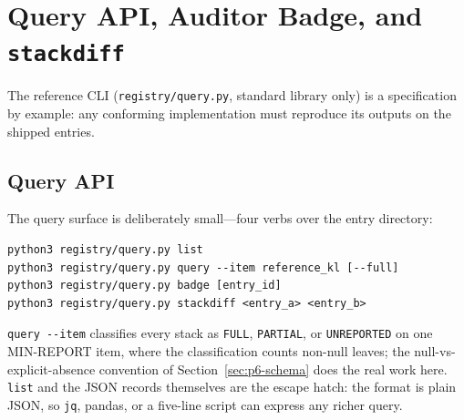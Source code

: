 \section{Query API, Auditor Badge, and \texttt{stackdiff}}
\label{sec:p6-query}

The reference CLI (\texttt{registry/query.py}, standard library only) is a
specification by example: any conforming implementation must reproduce its
outputs on the shipped entries.

\subsection{Query API}
\label{sec:p6-query-api}
The query surface is deliberately small---four verbs over the entry
directory:

\begin{lstlisting}[basicstyle=\ttfamily\scriptsize, frame=single,
  caption={The reference CLI surface.}, label={lst:p6-cli}]
python3 registry/query.py list
python3 registry/query.py query --item reference_kl [--full]
python3 registry/query.py badge [entry_id]
python3 registry/query.py stackdiff <entry_a> <entry_b>
\end{lstlisting}

\texttt{query -{}-item} classifies every stack as \texttt{FULL},
\texttt{PARTIAL}, or \texttt{UNREPORTED} on one MIN-REPORT item, where the
classification counts non-null leaves; the null-vs-explicit-absence convention
of Section~\ref{sec:p6-schema} does the real work here. \texttt{list} and the
JSON records themselves are the escape hatch: the format is plain JSON, so
\texttt{jq}, pandas, or a five-line script can express any richer query.

